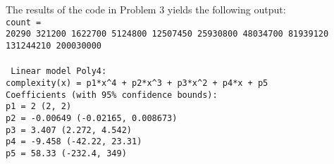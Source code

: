 \documentclass[11pt]{article}
\begin{document}
\section{}
The results of the code in Problem 3 yields the following output:\\
\texttt
{count = \\
20290      321200     1622700     5124800    12507450    25930800    48034700    81939120   131244210   200030000}\\\\
\texttt{
     Linear model Poly4:\\
     complexity(x) = p1*x\^{}4 + p2*x\^{}3 + p3*x\^{}2 + p4*x + p5\\
     Coefficients (with 95\% confidence bounds):\\
       p1 =           2  (2, 2)\\
       p2 =    -0.00649  (-0.02165, 0.008673)\\
       p3 =       3.407  (2.272, 4.542)\\
       p4 =      -9.458  (-42.22, 23.31)\\
       p5 =       58.33  (-232.4, 349)}\\
\end{document}
